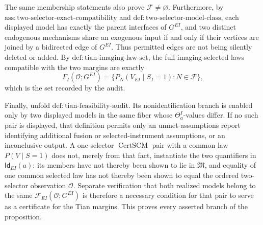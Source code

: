 The same membership statements also prove \(\mathcal F\ne\varnothing\).  Furthermore, by \(\mathrm{ass:two\text{-}selector\text{-}exact\text{-}compatibility}\) and \(\mathrm{def:two\text{-}selector\text{-}model\text{-}class}\), each displayed model has exactly the parent interfaces of \(G^{EI}\), and two distinct endogenous mechanisms share an exogenous input if and only if their vertices are joined by a bidirected edge of \(G^{EI}\).  Thus permitted edges are not being silently deleted or added.  By \(\mathrm{def:tian\text{-}imaging\text{-}law\text{-}set}\), the full imaging-selected laws compatible with the two margins are exactly
\[
 \Gamma_I(\mathcal O;G^{EI})
 =\{P_N(V_{EI}\mid S_I=1):N\in\mathcal F\},
\]
which is the set recorded by the audit.

Finally, unfold \(\mathrm{def:tian\text{-}feasibility\text{-}audit}\).  Its nonidentification branch is enabled only by two displayed models in the same fiber whose \(\Theta^I_a\)-values differ.  If no such pair is displayed, that definition permits only an unmet-assumptions report identifying additional fusion or selected-instrument assumptions, or an inconclusive output.  A one-selector \(\operatorname{CertSCM}\) pair with a common law \(P(V\mid S=1)\) does not, merely from that fact, instantiate the two quantifiers in \(\mathsf{Id}_{EI}(a)\): its members have not thereby been shown to lie in \(\mathfrak M\), and equality of one common selected law has not thereby been shown to equal the ordered two-selector observation \(\mathcal O\).  Separate verification that both realized models belong to the same \(\mathcal F_{EI}(\mathcal O;G^{EI})\) is therefore a necessary condition for that pair to serve as a certificate for the Tian margins.  This proves every asserted branch of the proposition.